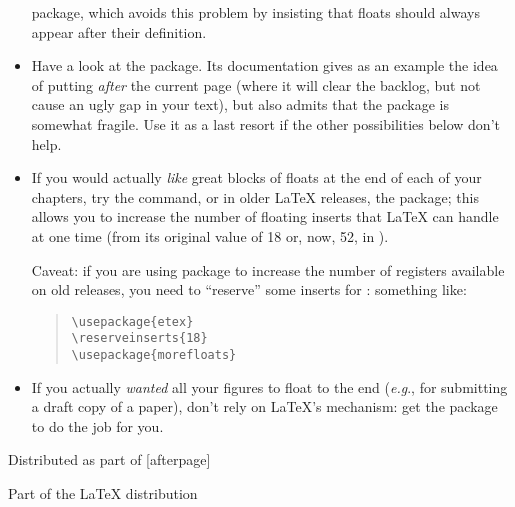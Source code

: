 \begin{itemize}
  package, which avoids this problem by insisting that floats should
  always appear after their definition.
\item Have a look at the \LaTeXe{}  package.
  Its documentation gives as an example the idea
  of putting  \emph{after} the current page (where it
  will clear the backlog, but not cause an ugly gap in your text), but
  also admits that the package is somewhat fragile.  Use it as a last
  resort if the other possibilities below don't help.
\item If you would actually \emph{like} great blocks of floats at the
  end of each of your chapters, try the  command,
  or in older \LaTeX{} releases, the  package;
  this allows you to increase the number of floating inserts that \LaTeX{}
  can handle at one time (from its original value of 18 or, now, 52, in
  \LaTeXe{}).

  Caveat: if you are using  package to increase the number of
  registers available on old releases, you need to ``reserve'' some inserts for
  : something like:
  \begin{quote}
\begin{verbatim}
\usepackage{etex}
\reserveinserts{18}
\usepackage{morefloats}
\end{verbatim}
  \end{quote}
\item If you actually \emph{wanted} all your figures to float to the
  end (\emph{e.g}., for submitting a draft copy of a paper), don't
  rely on \LaTeX{}'s mechanism: get the  package to do
  the job for you.
\end{itemize}
\begin{ctanrefs}
\item[afterpage.sty]Distributed as part of [afterpage]
\item[endfloat.sty]
\item[etex.sty]
\item[flafter.sty]Part of the \LaTeX{} distribution
\item[float.sty]
\item[morefloats.sty]
\item[placeins.sty]
\end{ctanrefs}


